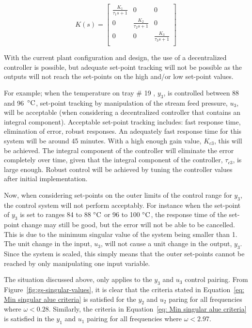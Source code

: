 \begin{equation}
	K(s) = \begin{bmatrix}
	\frac{K_1}{\tau_1s + 1} & 0 & 0\\
	 0 &\frac{K_2}{\tau_2s + 1} & 0\\
	 0 & 0 & \frac{K_3}{\tau_3s + 1}\\
	\end{bmatrix}
\end{equation} 

With the current plant configuration and design, the use of a decentralized controller is possible, but adequate set-point tracking will not be possible as the outputs will not reach the set-points on the high and/or low set-point values.

For example; when the temperature on tray \# 19 , $y_3$, is controlled between 88 and 96~$\celsius$, set-point tracking by manipulation of the stream feed pressure, $u_3$, will be acceptable (when considering a decentralized controller that contains an integral component). Acceptable set-point tracking includes: fast response time, elimination of error, robust responses. An adequately fast response time for this system will be around 45 minutes. With a high enough gain value, $K_{c3}$, this will be achieved. The integral component of the controller will eliminate the error completely over time, given that the integral component of the controller, $\tau_{c3}$, is large enough. Robust control will be achieved by tuning the controller values after initial implementation.

Now, when considering set-points on the outer limits of the control range for $y_3$, the control system will not perform acceptably. For instance when the set-point of $y_3$ is set to ranges 84 to 88 $\celsius$ or 96 to 100 $\celsius$, the response time of the set-point change may still be good, but the error will not be able to be cancelled. This is due to the minimum singular value of the system being smaller than 1. The unit change in the input, $u_3$, will not cause a unit change in the output, $y_3$. Since the system is scaled, this simply means that the outer set-points cannot be reached by only manipulating one input variable. 

The situation discussed above, only applies to the $y_3$ and $u_3$ control pairing. From Figure~\ref{fig:gs-singular-values}, it is clear that the criteria stated in Equation~\ref{eq: Min singular alue criteria} is satisfied for the $y_2$ and $u_2$ paring for all frequencies where $\omega<0.28$. Similarly, the criteria in Equation~\ref{eq: Min singular alue criteria} is satisfied in the $y_1$ and $u_1$ pairing for all frequencies where $\omega < 2.97$.

